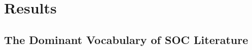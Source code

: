 \documentclass[
  letterpaper,
  DIV=11,
  numbers=noendperiod]{scrartcl}
\begin{document}
\section{Results}\label{results}

\subsection{The Dominant Vocabulary of SOC
Literature}\label{the-dominant-vocabulary-of-soc-literature}

\begin{figure}

\begin{minipage}{0.50\linewidth}



\end{minipage}%
%
\begin{minipage}{0.50\linewidth}

\end{minipage}
\end{figure}
\end{document}
